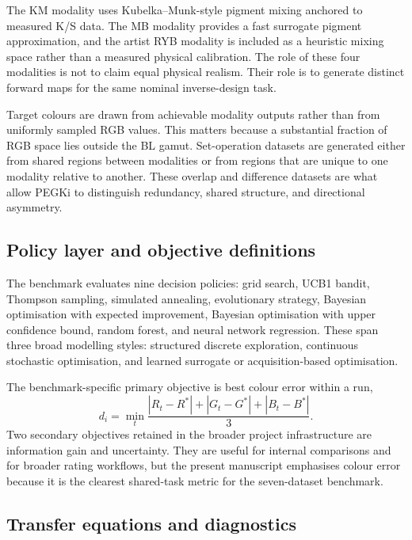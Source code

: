 \documentclass[twoside,twocolumn,9pt]{article}
\begin{document}
The KM modality uses Kubelka--Munk-style pigment mixing anchored to measured K/S data. The MB modality provides a fast surrogate pigment approximation, and the artist RYB modality is included as a heuristic mixing space rather than a measured physical calibration. The role of these four modalities is not to claim equal physical realism. Their role is to generate distinct forward maps for the same nominal inverse-design task.

Target colours are drawn from achievable modality outputs rather than from uniformly sampled RGB values. This matters because a substantial fraction of RGB space lies outside the BL gamut. Set-operation datasets are generated either from shared regions between modalities or from regions that are unique to one modality relative to another. These overlap and difference datasets are what allow PEGKi to distinguish redundancy, shared structure, and directional asymmetry.

\subsection{Policy layer and objective definitions}

The benchmark evaluates nine decision policies: grid search, UCB1 bandit, Thompson sampling, simulated annealing, evolutionary strategy, Bayesian optimisation with expected improvement, Bayesian optimisation with upper confidence bound, random forest, and neural network regression. These span three broad modelling styles: structured discrete exploration, continuous stochastic optimisation, and learned surrogate or acquisition-based optimisation.

The benchmark-specific primary objective is best colour error within a run,
\[
d_i=\min_t \frac{|R_t-R^\ast|+|G_t-G^\ast|+|B_t-B^\ast|}{3}.
\]
Two secondary objectives retained in the broader project infrastructure are information gain and uncertainty. They are useful for internal comparisons and for broader rating workflows, but the present manuscript emphasises colour error because it is the clearest shared-task metric for the seven-dataset benchmark.

\subsection{Transfer equations and diagnostics}
\end{document}
